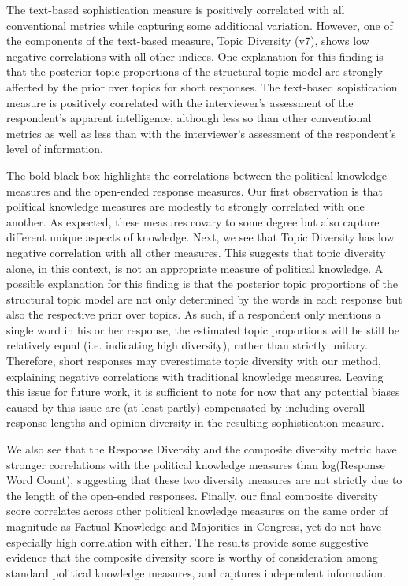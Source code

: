 \documentclass[12pt]{article}
\begin{document}
The text-based sophistication measure is positively correlated with all conventional metrics while capturing some additional variation. However, one of the components of the text-based measure, Topic Diversity (v7), shows low negative correlations with all other indices. One explanation for this finding is that the posterior topic proportions of the structural topic model are strongly affected by the prior over topics for short responses. The text-based sopistication measure is positively correlated with the interviewer's assessment of the respondent's apparent intelligence, although less so than other conventional metrics as well as less than with the interviewer's assessment of the respondent's level of information.

The bold black box highlights the correlations between the political knowledge measures and the open-ended response measures.  Our first observation is that political knowledge measures are modestly to strongly correlated with one another.  As expected, these measures covary to some degree but also capture different unique aspects of knowledge.  Next, we see that Topic Diversity has low negative correlation with all other measures.  This suggests that topic diversity alone, in this context, is not an appropriate measure of political knowledge.  A possible explanation for this finding is that the posterior topic proportions of the structural topic model are not only determined by the words in each response but also the respective prior over topics. As such, if a respondent only mentions a single word in his or her response, the estimated topic proportions will be still be relatively equal (i.e. indicating high diversity), rather than strictly unitary. Therefore, short responses may overestimate topic diversity with our method, explaining negative correlations with traditional knowledge measures. Leaving this issue for future work, it is sufficient to note for now that any potential biases caused by this issue are (at least partly) compensated by including overall response lengths and opinion diversity in the resulting sophistication measure.

We also see that the Response Diversity and the composite diversity metric have stronger correlations with the political knowledge measures than log(Response Word Count), suggesting that these two diversity measures are not strictly due to the length of the open-ended responses.  Finally, our final composite diversity score correlates across other political knowledge measures on the same order of magnitude as Factual Knowledge and Majorities in Congress, yet do not have especially high correlation with either.  The results provide some suggestive evidence that the composite diversity score is worthy of consideration among standard political knowledge measures, and captures independent information.    
\end{document}
